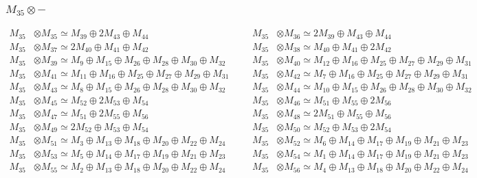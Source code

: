 \subsubsection{$ M_{35}\otimes -$}
\begin{align*}
M_{35} &\otimes M_{35} \simeq M_{39} \oplus 2M_{43} \oplus M_{44} &&& M_{35} &\otimes M_{36} \simeq 2M_{39} \oplus M_{43} \oplus M_{44}\\
M_{35} &\otimes M_{37} \simeq 2M_{40} \oplus M_{41} \oplus M_{42} &&& M_{35} &\otimes M_{38} \simeq M_{40} \oplus M_{41} \oplus 2M_{42}\\
M_{35} &\otimes M_{39} \simeq M_{9} \oplus M_{15} \oplus M_{26} \oplus M_{28} \oplus M_{30} \oplus M_{32} &&& M_{35} &\otimes M_{40} \simeq M_{12} \oplus M_{16} \oplus M_{25} \oplus M_{27} \oplus M_{29} \oplus M_{31}\\
M_{35} &\otimes M_{41} \simeq M_{11} \oplus M_{16} \oplus M_{25} \oplus M_{27} \oplus M_{29} \oplus M_{31} &&& M_{35} &\otimes M_{42} \simeq M_{7} \oplus M_{16} \oplus M_{25} \oplus M_{27} \oplus M_{29} \oplus M_{31}\\
M_{35} &\otimes M_{43} \simeq M_{8} \oplus M_{15} \oplus M_{26} \oplus M_{28} \oplus M_{30} \oplus M_{32} &&& M_{35} &\otimes M_{44} \simeq M_{10} \oplus M_{15} \oplus M_{26} \oplus M_{28} \oplus M_{30} \oplus M_{32}\\
M_{35} &\otimes M_{45} \simeq M_{52} \oplus 2M_{53} \oplus M_{54} &&& M_{35} &\otimes M_{46} \simeq M_{51} \oplus M_{55} \oplus 2M_{56}\\
M_{35} &\otimes M_{47} \simeq M_{51} \oplus 2M_{55} \oplus M_{56} &&& M_{35} &\otimes M_{48} \simeq 2M_{51} \oplus M_{55} \oplus M_{56}\\
M_{35} &\otimes M_{49} \simeq 2M_{52} \oplus M_{53} \oplus M_{54} &&& M_{35} &\otimes M_{50} \simeq M_{52} \oplus M_{53} \oplus 2M_{54}\\
M_{35} &\otimes M_{51} \simeq M_{3} \oplus M_{13} \oplus M_{18} \oplus M_{20} \oplus M_{22} \oplus M_{24} &&& M_{35} &\otimes M_{52} \simeq M_{6} \oplus M_{14} \oplus M_{17} \oplus M_{19} \oplus M_{21} \oplus M_{23}\\
M_{35} &\otimes M_{53} \simeq M_{5} \oplus M_{14} \oplus M_{17} \oplus M_{19} \oplus M_{21} \oplus M_{23} &&& M_{35} &\otimes M_{54} \simeq M_{1} \oplus M_{14} \oplus M_{17} \oplus M_{19} \oplus M_{21} \oplus M_{23}\\
M_{35} &\otimes M_{55} \simeq M_{2} \oplus M_{13} \oplus M_{18} \oplus M_{20} \oplus M_{22} \oplus M_{24} &&& M_{35} &\otimes M_{56} \simeq M_{4} \oplus M_{13} \oplus M_{18} \oplus M_{20} \oplus M_{22} \oplus M_{24}\\
\end{align*}


